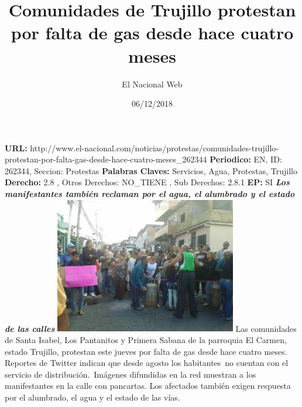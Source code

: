 \documentclass{article}%
\title{\textbf{Comunidades de Trujillo protestan por falta de gas desde hace cuatro meses}}%
\author{El Nacional Web}%
\date{06/12/2018}%
\begin{document}
%
\normalsize%
\maketitle%
\textbf{URL: }%
http://www.el{-}nacional.com/noticias/protestas/comunidades{-}trujillo{-}protestan{-}por{-}falta{-}gas{-}desde{-}hace{-}cuatro{-}meses\_262344\newline%
%
\textbf{Periodico: }%
EN, %
ID: %
262344, %
Seccion: %
Protestas\newline%
%
\textbf{Palabras Claves: }%
Servicios, Agua, Protestas, Trujillo\newline%
%
\textbf{Derecho: }%
2.8%
, Otros Derechos: %
NO\_TIENE%
, Sub Derechos: %
2.8.1%
\newline%
%
\textbf{EP: }%
SI\newline%
\newline%
%
\textbf{\textit{Los manifestantes también reclaman por el agua, el alumbrado y el estado de las calles}}%
\newline%
\newline%
%
\includegraphics[width=300px]{2.jpg}%
\newline%
%
Las comunidades de Santa Isabel, Los Pantanitos y Primera Sabana de la parroquia El Carmen, estado Trujillo, protestan este jueves por falta de gas desde hace cuatro meses.%
\newline%
%
Reportes de Twitter indican que desde agosto los habitantes~no cuentan con el servicio de distribución.~Imágenes difundidas en la red muestran a los manifestantes en la calle con pancartas.%
\newline%
%
Los afectados también exigen respuesta por el alumbrado, el agua y el estado de las vías.%
\newline%
%
\end{document}
